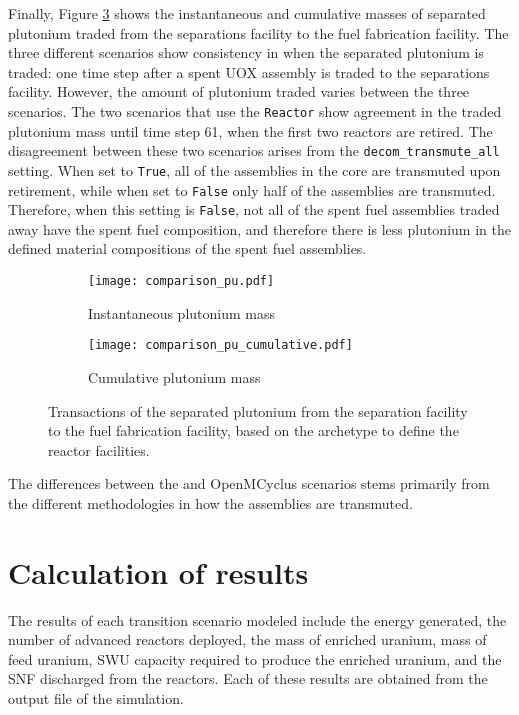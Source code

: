 Finally, Figure \ref{fig:comparison_pu} shows the instantaneous and cumulative 
masses of separated plutonium traded from the separations facility to 
the fuel fabrication facility. The three different scenarios show consistency
in when the separated plutonium is traded: one time step after a spent
\gls{UOX} assembly is traded to the separations facility. However, the 
amount of plutonium traded varies between the three scenarios. The two 
scenarios that use the \Cycamore \texttt{Reactor} show agreement in the 
traded plutonium mass until time step 61, when the first two reactors are
retired. The disagreement between these two scenarios arises from the 
\texttt{decom\_transmute\_all} setting. When set to \texttt{True}, 
all of the assemblies in the core are transmuted upon retirement, 
while when set to \texttt{False} only half of the assemblies are 
transmuted. Therefore, when this setting is \texttt{False}, not all of the 
spent fuel assemblies traded away have the spent fuel composition, and 
therefore there is less plutonium in the defined material compositions 
of the spent fuel assemblies. 

\begin{figure}
    \centering
    \begin{subfigure}[b]{0.48\textwidth}
        \centering
        \texttt{[image: comparison\_pu.pdf]}
        \caption{Instantaneous plutonium mass}
        \label{fig:comparison_pu_inst}
    \end{subfigure}
    \hfill
    \begin{subfigure}[b]{0.48\textwidth}
        \centering
        \texttt{[image: comparison\_pu\_cumulative.pdf]}
        \caption{Cumulative plutonium mass}
        \label{fig:comparison_pu_cumulative}
    \end{subfigure}
       \caption{Transactions of the separated plutonium from the
       separation facility to the fuel fabrication facility, based 
       on the archetype to define the reactor facilities.}
       \label{fig:comparison_pu}
\end{figure}

The differences between the \Cycamore and OpenMCyclus scenarios stems 
primarily from the different methodologies in how the assemblies 
are transmuted. 

\section{Calculation of results} \label{sec:results_calc}
The results of each transition scenario modeled include the energy generated, 
the number of advanced reactors deployed, the mass of enriched uranium, 
mass of feed uranium, \gls{SWU} capacity required to produce the enriched 
uranium, and the \gls{SNF} discharged from the reactors. Each of these results 
are obtained from the \Cyclus output file of the simulation. 


